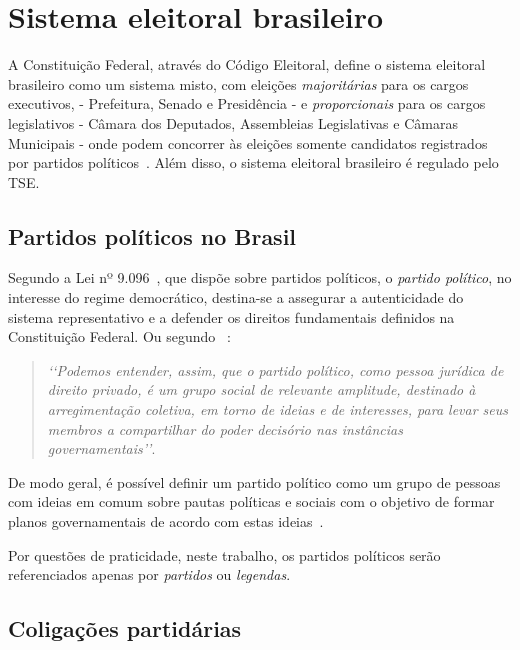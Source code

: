 \section{Sistema eleitoral brasileiro}

A Constituição Federal, através do Código Eleitoral, define o sistema eleitoral brasileiro como um sistema misto, com eleições \emph{majoritárias} para os cargos executivos, - Prefeitura, Senado e Presidência - e \emph{proporcionais} para os cargos legislativos - Câmara dos Deputados, Assembleias Legislativas e Câmaras Municipais - onde podem concorrer às eleições somente candidatos registrados por partidos políticos~\cite{brasil1965lei4737}. Além disso, o sistema eleitoral brasileiro é regulado pelo \gls{TSE}.

\subsection{Partidos políticos no Brasil}
\label{conceitos__partidos-brasil}

Segundo a  Lei nº 9.096~\cite{brasil1995lei9096}, que dispõe sobre partidos políticos, o \emph{partido político}, no interesse do regime democrático, destina-se a assegurar a autenticidade do sistema representativo e a defender os direitos fundamentais definidos na Constituição Federal. Ou segundo ~\cite{michels2006direito}:

\begin{quotation}
    \emph{‘‘Podemos entender, assim, que o partido político, como pessoa jurídica de direito privado, é um grupo social de relevante amplitude, destinado à arregimentação coletiva, em torno de ideias e de interesses, para levar seus membros a compartilhar do poder decisório nas instâncias governamentais’’}.
\end{quotation}

De modo geral, é possível definir um partido político como um grupo de pessoas com ideias em comum sobre pautas políticas e sociais com o objetivo de formar planos governamentais de acordo com estas ideias~\cite{garibaldi2017partidos}.

Por questões de praticidade, neste trabalho, os partidos políticos serão referenciados apenas por \emph{partidos} ou \emph{legendas}.


\subsection{Coligações partidárias}
\label{conceitos__coligacoes}

